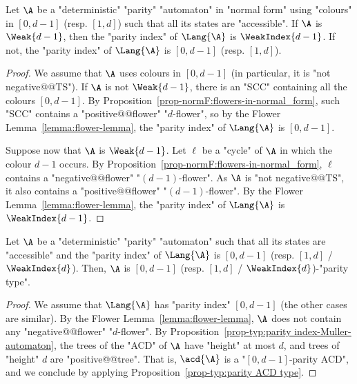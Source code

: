 \documentclass[10pt,a4paper]{amsart}
\begin{document}
\begin{corollary}\label{cor-app-weak:normal-form-index-par}
	Let $\A$ be a "deterministic" "parity" "automaton" in "normal form" using "colours" in $[0,d-1]$ (resp. $[1,d]$) such that all its states are "accessible". If $\A$ is $\Weak{d-1}$, then the "parity index" of $\Lang{\A}$ is $\WeakIndex{d-1}$. If not, the "parity index" of $\Lang{\A}$ is $[0,d-1]$ (resp. $[1,d]$).
\end{corollary}
\begin{proof}
	We assume that $\A$ uses colours in $[0,d-1]$ (in particular, it is "not negative@@TS").
	If $\A$ is not $\Weak{d-1}$, there is an "SCC" containing all the colours $[0,d-1]$.  By Proposition~\ref{prop-normF:flowers-in-normal_form}, such "SCC" contains a "positive@@flower" "$d$-flower", so by the Flower Lemma~\ref{lemma:flower-lemma}, the "parity index" of $\Lang{\A}$ is $[0,d-1]$.
	
	Suppose now that $\A$ is $\Weak{d-1}$. Let $\ell$ be a "cycle" of $\A$ in which the colour $d-1$ occurs. By Proposition~\ref{prop-normF:flowers-in-normal_form}, $\ell$ contains a "negative@@flower" "$(d-1)$-flower". As $\A$ is "not negative@@TS", it also contains a "positive@@flower" "$(d-1)$-flower". By the Flower Lemma~\ref{lemma:flower-lemma}, the "parity index" of $\Lang{\A}$ is $\WeakIndex{d-1}$.	
\end{proof}


\begin{corollary}\label{cor-app-weak:index-parity-type}
	Let $\A$ be a "deterministic" "parity" "automaton" such that all its states are "accessible" and the "parity index" of $\Lang{\A}$ is $[0,d-1]$ (resp. $[1,d]$ / $\WeakIndex{d}$). 
	Then, $\A$ is $[0,d-1]$ (resp. $[1,d]$ / $\WeakIndex{d}$)-"parity type". 
\end{corollary}
\begin{proof}
	We assume that $\Lang{\A}$ has "parity index" $[0,d-1]$ (the other cases are similar). By the Flower Lemma~\ref{lemma:flower-lemma}, $\A$ does not contain any "negative@@flower" "$d$-flower". 
	By Proposition~\ref{prop-typ:parity index-Muller-automaton}, the trees of the "ACD" of $\A$ have "height" at most $d$, and trees of "height" $d$ are "positive@@tree". That is, $\acd{\A}$ is a "$[0,d-1]$-parity ACD", and we conclude by applying Proposition~\ref{prop-typ:parity ACD type}.
\end{proof}
\end{document}
